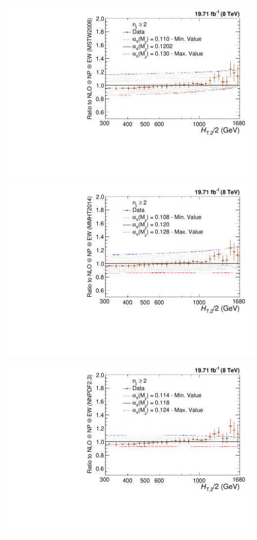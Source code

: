 \documentclass{beamer}
\begin{document}
\begin{frame}
\begin{center}
\includegraphics[scale = 0.207]{Plots_HT_2_150/Sensitivity_2_ratio_NLO_MSTW2008_EW.pdf}\\
\vspace{5mm}
\includegraphics[scale = 0.207]{Plots_HT_2_150/Sensitivity_2_ratio_NLO_MMHT2014_EW.pdf}%
\hspace{0.3mm}
\includegraphics[scale = 0.207]{Plots_HT_2_150/Sensitivity_2_ratio_NLO_NNPDF23_EW.pdf}
\end{center}
\end{frame}
\end{document}

